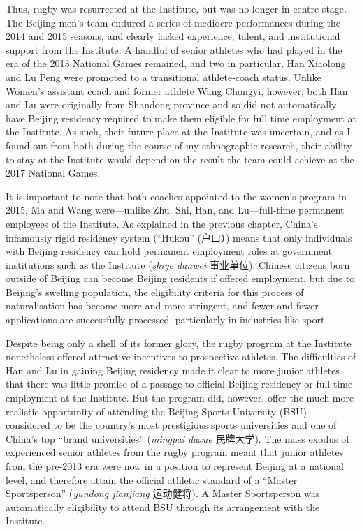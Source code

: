 \begin{CJK}{UTF8}{gbsn}
Thus, rugby was resurrected at the Institute, but was no longer in centre stage. The Beijing men's team endured a series of mediocre performances during the 2014 and 2015 seasons, and clearly lacked experience, talent, and institutional support from the Institute.  A handful of senior athletes who had played in the era of the 2013 National Games remained, and two in particular, Han Xiaolong and Lu Peng were promoted to a transitional athlete-coach status. Unlike Women's assistant coach and former athlete Wang Chongyi, however, both Han and Lu were originally from Shandong province and so did not automatically have Beijing residency required to make them eligible for full time employment at the Institute.  As such, their future place at the Institute was uncertain, and as I found out from both during the course of my ethnographic research, their ability to stay at the Institute would depend on the result the team could achieve at the 2017 National Games.

It is important to note that both coaches appointed to the women's program in 2015, Ma and Wang were---unlike Zhu, Shi, Han, and Lu---full-time permanent employees of the Institute. As explained in the previous chapter, China's infamously rigid residency system (``Hukou'' (户口）) means that only individuals with Beijing residency can hold permanent employment roles at government institutions such as the Institute (\textit{shiye danwei} 事业单位).  Chinese citizens born outside of Beijing can become Beijing residents if offered employment, but due to Beijing's swelling population, the eligibility criteria for this process of naturalisation has become more and more stringent, and fewer and fewer applications are successfully processed, particularly in industries like sport.

Despite being only a shell of its former glory, the rugby program at the Institute nonetheless offered attractive incentives to prospective athletes.  The difficulties of Han and Lu in gaining Beijing residency made it clear to more junior athletes that there was little promise of a passage to official Beijing residency or full-time employment at the Institute. But the program did, however, offer the much more realistic opportunity of attending the Beijing Sports University (BSU)---considered to be the country's most prestigious sports universities and one of China's top ``brand universities'' (\textit{mingpai daxue} 民牌大学).  The mass exodus of experienced senior athletes from the rugby program meant that junior athletes from the pre-2013 era were now in a position to represent Beijing at a national level, and therefore attain the official athletic standard of a ``Master Sportsperson'' (\textit{yundong jianjiang} 运动健将).  A Master Sportsperson was automatically eligibility to attend BSU through its arrangement with the Institute.



\end{CJK}
